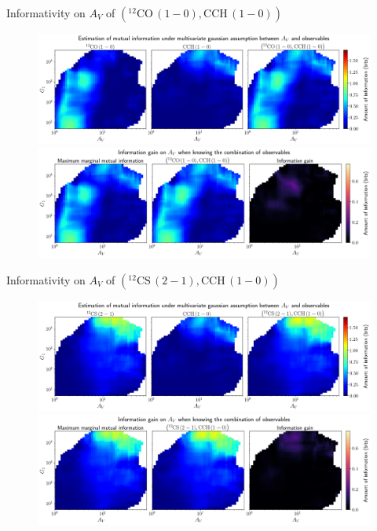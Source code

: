 \documentclass{beamer}
\begin{document}
\begin{frame}{Informativity on $A_V$ of $\left(\mathrm{^{12}CO\,(1-0)},\mathrm{CCH\,(1-0)}\right)$}
    \begin{figure}
        \centering
        \includegraphics[width=0.95\linewidth]{../linearinfogauss/av__12co10_cch10_linearinfogauss.png}
        \vfill
        \includegraphics[width=0.95\linewidth]{../linearinfogauss/av__12co10_cch10_linearinfogauss_gain.png}
    \end{figure}
\end{frame}

\begin{frame}{Informativity on $A_V$ of $\left(\mathrm{^{12}CS\,(2-1)},\mathrm{CCH\,(1-0)}\right)$}
    \begin{figure}
        \centering
        \includegraphics[width=0.95\linewidth]{../linearinfogauss/av__12cs21_cch10_linearinfogauss.png}
        \vfill
        \includegraphics[width=0.95\linewidth]{../linearinfogauss/av__12cs21_cch10_linearinfogauss_gain.png}
    \end{figure}
\end{frame}
\end{document}
